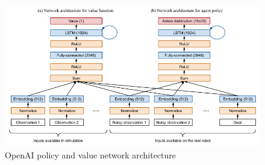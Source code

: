 \begin{figure}[htbp]
    \centering
    \includegraphics[width=1.\textwidth]{figures/openai}
    \caption{OpenAI policy and value network architecture \cite{openai2019rubiks}}
    \label{fig:dql}
\end{figure}

